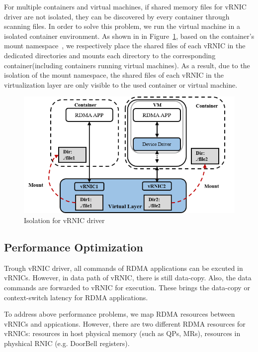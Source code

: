 For multiple containers and virtual machines, if shared memory files for vRNIC driver are not isolated, they can be discovered by every container through scanning files. In order to solve this problem, we run the virtual machine in a isolated container environment. As shown in in Figure~\ref{fig:interface-isolate}, based on the container's mount namespace~\cite{mount-ns}, we respectively place the shared files of each vRNIC in the dedicated directories and mounts each directory to the corresponding container(including containers running virtual machines). As a result, due to the isolation of the mount namespace, the shared files of each vRNIC in the virtualization layer are only visible to the used container or virtual machine.  

\begin{figure}[!ht]
	\centering
	\includegraphics[width=1.0\linewidth]{images/interface-isolate}
	\caption{Isolation for vRNIC driver}
	\label{fig:interface-isolate}
\end{figure}


\subsection{Performance Optimization}

Trough vRNIC driver, all commands of RDMA applications can be excuted in vRNICs. However, in data path of vRNIC, there is still data-copy. Also, the data commands are forwarded to vRNIC for execution. These brings the data-copy or context-switch latency for RDMA applications. 

To address above performance problems, we map RDMA resources between vRNICs and appications. However, there are two different RDMA resources for vRNICs: resources in host physical memory (such as QPs, MRs), resources in physhical RNIC (e.g. DoorBell registers). 

